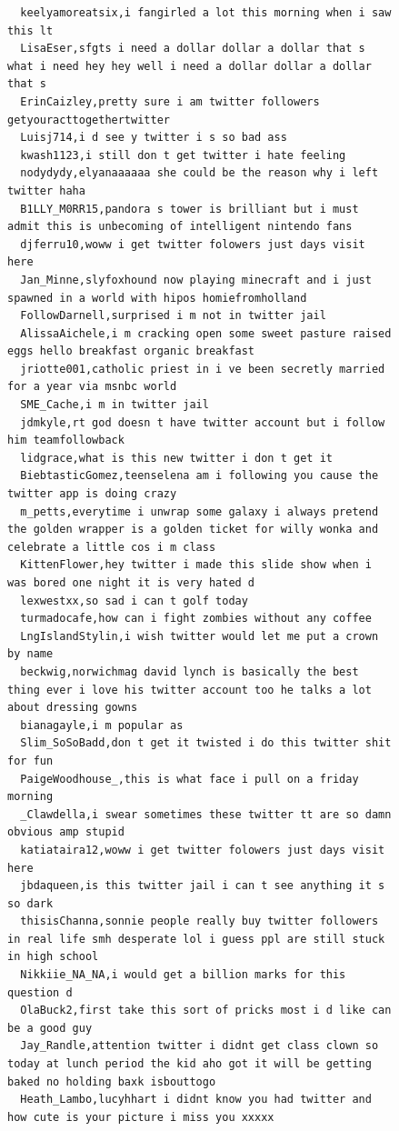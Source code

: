 \begin{figure}[htpb]
\begin{verbatim}
  keelyamoreatsix,i fangirled a lot this morning when i saw this lt
  LisaEser,sfgts i need a dollar dollar a dollar that s what i need hey hey well i need a dollar dollar a dollar that s
  ErinCaizley,pretty sure i am twitter followers getyouracttogethertwitter
  Luisj714,i d see y twitter i s so bad ass
  kwash1123,i still don t get twitter i hate feeling
  nodydydy,elyanaaaaaa she could be the reason why i left twitter haha
  B1LLY_M0RR15,pandora s tower is brilliant but i must admit this is unbecoming of intelligent nintendo fans
  djferru10,woww i get twitter folowers just days visit here
  Jan_Minne,slyfoxhound now playing minecraft and i just spawned in a world with hipos homiefromholland
  FollowDarnell,surprised i m not in twitter jail
  AlissaAichele,i m cracking open some sweet pasture raised eggs hello breakfast organic breakfast
  jriotte001,catholic priest in i ve been secretly married for a year via msnbc world
  SME_Cache,i m in twitter jail
  jdmkyle,rt god doesn t have twitter account but i follow him teamfollowback
  lidgrace,what is this new twitter i don t get it
  BiebtasticGomez,teenselena am i following you cause the twitter app is doing crazy
  m_petts,everytime i unwrap some galaxy i always pretend the golden wrapper is a golden ticket for willy wonka and celebrate a little cos i m class
  KittenFlower,hey twitter i made this slide show when i was bored one night it is very hated d
  lexwestxx,so sad i can t golf today
  turmadocafe,how can i fight zombies without any coffee
  LngIslandStylin,i wish twitter would let me put a crown by name
  beckwig,norwichmag david lynch is basically the best thing ever i love his twitter account too he talks a lot about dressing gowns
  bianagayle,i m popular as
  Slim_SoSoBadd,don t get it twisted i do this twitter shit for fun
  PaigeWoodhouse_,this is what face i pull on a friday morning
  _Clawdella,i swear sometimes these twitter tt are so damn obvious amp stupid
  katiataira12,woww i get twitter folowers just days visit here
  jbdaqueen,is this twitter jail i can t see anything it s so dark
  thisisChanna,sonnie people really buy twitter followers in real life smh desperate lol i guess ppl are still stuck in high school
  Nikkiie_NA_NA,i would get a billion marks for this question d
  OlaBuck2,first take this sort of pricks most i d like can be a good guy
  Jay_Randle,attention twitter i didnt get class clown so today at lunch period the kid aho got it will be getting baked no holding baxk isbouttogo
  Heath_Lambo,lucyhhart i didnt know you had twitter and how cute is your picture i miss you xxxxx

\end{verbatim}
\end{figure}
